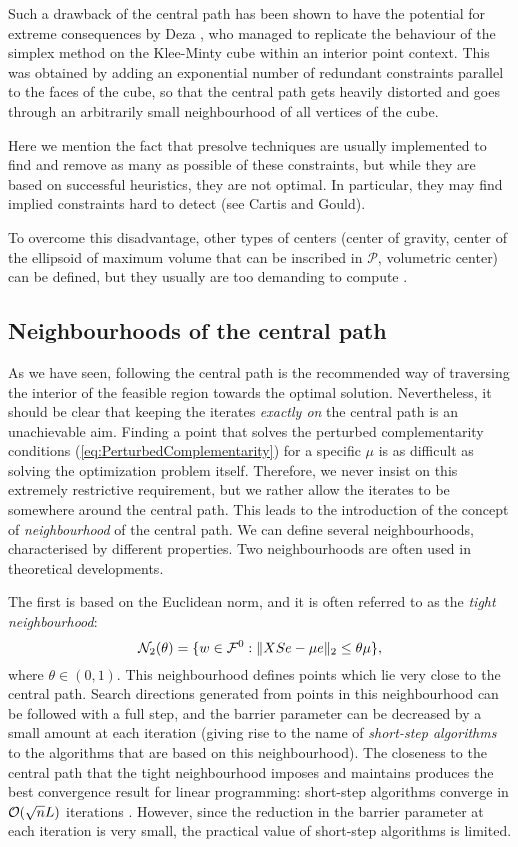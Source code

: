 Such a drawback of the central path has been shown to 
have the potential for extreme
consequences by Deza \etal \cite{DezaNematollahiPeyghamiTerlaky},
who managed to replicate the behaviour of the simplex method
on the Klee-Minty cube within an interior point context. 
This was obtained by adding an exponential
number of redundant constraints parallel to the faces of the cube, so
that the central path gets heavily distorted and goes through
an arbitrarily small neighbourhood of all vertices of the cube.

Here we mention the fact that presolve
techniques are usually implemented to find and remove as many as
possible of these constraints, but while they are based on successful
heuristics, they are not optimal. In particular, they may find 
implied constraints hard to detect (see Cartis and Gould).

To overcome this disadvantage,
other types of centers (center of gravity, center of the ellipsoid of 
maximum volume that can be inscribed in $\mathcal{P}$, volumetric center) 
can be defined, but they usually are too demanding to compute 
\cite{Gonzaga92}. 

%
%
\subsection{Neighbourhoods of the central path}
\label{sec:Neighbourhoods}

As we have seen, following the central path is the recommended
way of traversing the interior of the feasible region towards
the optimal solution. Nevertheless, it should be clear that keeping the
iterates {\em exactly on} the central path is an unachievable aim.
Finding a point that solves the perturbed complementarity conditions 
(\ref{eq:PerturbedComplementarity}) for a specific $\mu$ 
is as difficult as solving the optimization problem itself.
%
Therefore, we never insist on this extremely restrictive requirement,
but we rather allow the iterates to be somewhere around the central path.
This leads to the introduction of the concept of
{\em neighbourhood} of the central path. 
We can define several neighbourhoods, characterised
by different properties.
Two neighbourhoods are often used in theoretical developments.

The first is based on the Euclidean norm, and it is often referred
to as the {\em tight neighbourhood}:
\[
\mathcal{N}_2(\theta) = \{ w \in \mathcal{F}^0 :
                         \| XSe - \mu e \|_2 \le \theta\mu \},
\]
where $\theta \in (0,1)$.
This neighbourhood defines points which lie very close to the central path.
Search directions generated from points in this neighbourhood can be 
followed with a full step, and the barrier parameter can be decreased
by a small amount at each iteration (giving rise to the name
of {\em short-step algorithms} to the algorithms that are based on
this neighbourhood). 
The closeness to the central path that the tight neighbourhood
imposes and maintains produces the best convergence result
for linear programming: short-step algorithms converge in 
$\mathcal{O}(\sqrt{n}L)$ iterations \cite{KojimaMizunoYoshise89b,MonteiroAdler89a}.
However, since the reduction in the barrier parameter at each iteration 
is very small, the practical value of short-step algorithms is limited.

